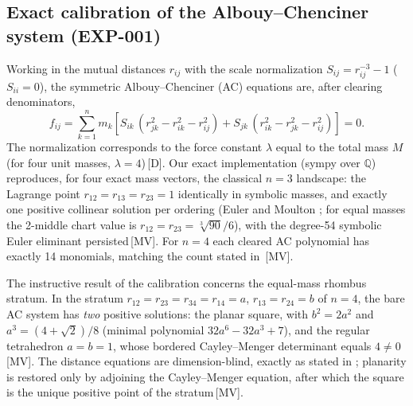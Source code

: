 \documentclass[11pt]{article}
\theoremstyle{definition}
\theoremstyle{remark}
\newcommand{\mk}[1]{\,{\scriptsize[#1]}}
\newcommand{\MV}{\mk{MV}}
\newcommand{\Dm}{\mk{D}}
\begin{document}
\subsection{Exact calibration of the Albouy--Chenciner system (EXP-001)}\label{sec:calib}

Working in the mutual distances $r_{ij}$ with the scale normalization
$S_{ij}=r_{ij}^{-3}-1$ ($S_{ii}=0$), the symmetric Albouy--Chenciner (AC)
equations \cite{AC98,HM06} are, after clearing denominators,
\begin{equation}
f_{ij}=\sum_{k=1}^{n} m_k\left[S_{ik}\,(r_{jk}^2-r_{ik}^2-r_{ij}^2)
+S_{jk}\,(r_{ik}^2-r_{jk}^2-r_{ij}^2)\right]=0 .
\end{equation}
The normalization corresponds to the force constant $\lambda$ equal to the total mass $M$ (for four
unit masses, $\lambda=4$)\Dm.
Our exact implementation (sympy over $\mathbb{Q}$) reproduces, for four
exact mass vectors, the classical $n=3$ landscape: the Lagrange point \cite{Lagrange72}
$r_{12}=r_{13}=r_{23}=1$ identically in symbolic masses, and exactly one
positive collinear solution per ordering (Euler \cite{Euler67} and Moulton \cite{Moulton10}; for equal masses the
2-middle chart value is $r_{12}=r_{23}=\sqrt[3]{90}/6$), with the degree-54
symbolic Euler eliminant persisted\MV. For $n=4$ each cleared AC polynomial has
exactly 14 monomials, matching the count stated in \cite{HM06}\MV.

The instructive result of the calibration concerns the equal-mass rhombus
stratum. In the stratum
$r_{12}=r_{23}=r_{34}=r_{14}=a$, $r_{13}=r_{24}=b$ of $n=4$, the bare AC system
has \emph{two} positive solutions: the planar square, with $b^2=2a^2$ and
$a^3=(4+\sqrt2)/8$ (minimal polynomial $32a^6-32a^3+7$), and the regular
tetrahedron $a=b=1$, whose bordered Cayley--Menger determinant equals $4\neq0$\MV.
The distance equations are dimension-blind, exactly as stated in \cite{HM06};
planarity is restored only by adjoining the Cayley--Menger equation, after
which the square is the unique positive point of the stratum\MV.
\end{document}

